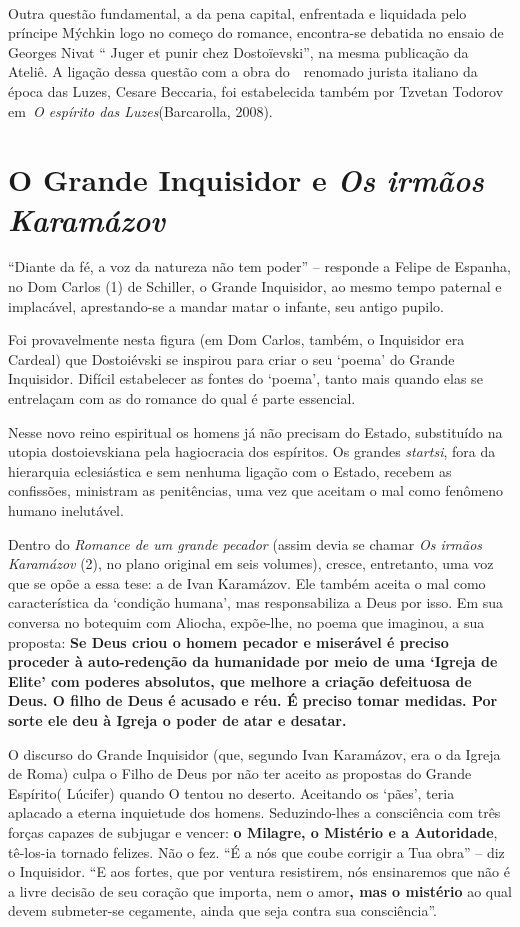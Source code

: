 ~

Outra questão fundamental, a da pena capital, enfrentada e liquidada
pelo príncipe Mýchkin logo no começo do romance, encontra-se debatida no
ensaio de Georges Nivat `` Juger et punir chez Dostoïevski'', na mesma
publicação da Ateliê. A ligação dessa questão com a obra do~~renomado
jurista italiano da época das Luzes, Cesare Beccaria, foi estabelecida
também por Tzvetan Todorov em~\emph{O espírito das Luzes}(Barcarolla,
2008).

\chapter{O Grande Inquisidor e \emph{Os irmãos Karamázov}}

``Diante da fé, a voz da natureza não tem poder'' -- responde a Felipe
de Espanha, no Dom Carlos (1) de Schiller, o Grande Inquisidor, ao mesmo
tempo paternal e implacável, aprestando-se a mandar matar o infante, seu
antigo pupilo.

Foi provavelmente nesta figura (em Dom Carlos, também, o Inquisidor era
Cardeal) que Dostoiévski se inspirou para criar o seu `poema' do Grande
Inquisidor. Difícil estabelecer as fontes do `poema', tanto mais quando
elas se entrelaçam com as do romance do qual é parte essencial.

Nesse novo reino espiritual os homens já não precisam do Estado,
substituído na utopia dostoievskiana pela hagiocracia dos espíritos. Os
grandes \emph{startsi}, fora da hierarquia eclesiástica e sem nenhuma
ligação com o Estado, recebem as confissões, ministram as penitências,
uma vez que aceitam o mal como fenômeno humano inelutável.

Dentro do \emph{Romance de um grande pecador} (assim devia se chamar
\emph{Os irmãos Karamázov} (2), no plano original em seis volumes),
cresce, entretanto, uma voz que se opõe a essa tese: a de Ivan
Karamázov. Ele também aceita o mal como característica da `condição
humana', mas responsabiliza a Deus por isso. Em sua conversa no botequim
com Aliocha, expõe-lhe, no poema que imaginou, a sua proposta:
\textbf{Se Deus criou o homem pecador e miserável é preciso proceder à
auto-redenção da humanidade por meio de uma `Igreja de Elite' com
poderes absolutos, que melhore a criação defeituosa de Deus. O filho de
Deus é acusado e réu. É preciso tomar medidas. Por sorte ele deu à
Igreja o poder de atar e desatar.}

O discurso do Grande Inquisidor (que, segundo Ivan Karamázov, era o da
Igreja de Roma) culpa o Filho de Deus por não ter aceito as propostas do
Grande Espírito( Lúcifer) quando O tentou no deserto. Aceitando os
`pães', teria aplacado a eterna inquietude dos homens. Seduzindo-lhes a
consciência com três forças capazes de subjugar e vencer: \textbf{o
Milagre, o Mistério e a Autoridade}, tê-los-ia tornado felizes. Não o
fez. ``É a nós que coube corrigir a Tua obra'' -- diz o Inquisidor. ``E
aos fortes, que por ventura resistirem, nós ensinaremos que não é a
livre decisão de seu coração que importa, nem o amor\textbf{, mas o
mistério} ao qual devem submeter-se cegamente, ainda que seja contra sua
consciência''.

